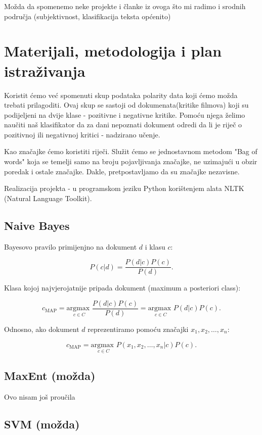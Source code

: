 \documentclass[12pt,a4paper,titlepage]{article}
\begin{document}
Možda da spomenemo neke projekte i članke iz ovoga što mi radimo i srodnih područja (subjektivnost, klasifikacija teksta općenito)

\section{Materijali, metodologija i plan istraživanja}

Koristit ćemo već spomenuti skup podataka polarity data koji ćemo možda trebati prilagoditi. Ovaj skup se sastoji od dokumenata(kritike filmova) koji su podijeljeni na dvije klase - pozitivne i negativne kritike. Pomoću njega želimo naučiti naš klasifikator da za dani nepoznati dokument odredi da li je riječ o pozitivnoj ili negativnoj kritici - nadzirano učenje.

Kao značajke ćemo koristiti riječi. Služit ćemo se jednostavnom metodom "Bag of words" koja se temelji samo na broju pojavljivanja značajke, ne uzimajući u obzir poredak i ostale značajke. Dakle, pretpostavljamo da su značajke nezavisne.

Realizacija projekta - u programskom jeziku Python korištenjem alata NLTK (Natural Language Toolkit).

\subsection{Naive Bayes}

Bayesovo pravilo primijenjno na dokument $d$ i klasu $c$:

\[P(c|d) = \frac{P(d|c)P(c)}{P(d)}.\]

Klasa kojoj najvjerojatnije pripada dokument (maximum a posteriori class):

\[c_{\text{MAP}} = \underset{{c \in C}}{\text{argmax }} \frac{P(d|c)P(c)}{P(d)}
= \underset{{c \in C}}{\text{argmax }} P(d|c)P(c).\] 

Odnosno, ako dokument $d$ reprezentiramo pomoću značajki $x_1, x_2, \ldots, x_n$:

\[c_{\text{MAP}} = \underset{{c \in C}}{\text{argmax }} P(x_1, x_2, \ldots, x_n|c)P(c).\] 

\subsection{MaxEnt (možda)}

Ovo nisam još proučila

\subsection{SVM (možda)}
\end{document}
